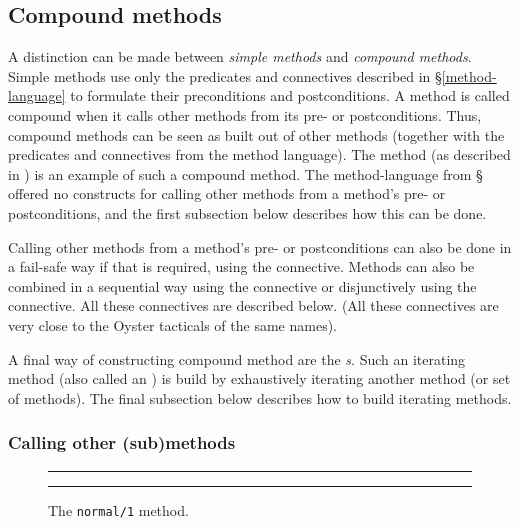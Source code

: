 \subsection {Compound methods}

A distinction can be made between {\em simple
methods\/} and {\em compound
methods\/}. Simple methods use only
the predicates and connectives described in
\S\ref{method-language} to formulate their preconditions and
postconditions. A method is called compound when it calls other
methods from its pre- or postconditions.  Thus, compound methods can
be seen as built out of other methods (together with the predicates
and connectives from the method language).  The {\tt {}}
method (as described in \cite{pub349}) is an example of such a
compound method. The method-language from
\S{} offered no constructs for calling other
methods from a method's pre- or postconditions, and the first
subsection below describes how this can be done.

Calling other methods from a method's pre- or postconditions can also be
done in a fail-safe way if that is required, using the 
connective. 
Methods can also be combined in a sequential way using the 
connective or disjunctively using the  connective. All
these connectives are described below. (All these connectives are very
close to the Oyster tacticals of the same names). 

A final way of constructing compound method are the
{\em {}s}. Such an iterating method (also called
an {\em {}\/}) is build by exhaustively iterating another
method (or set of methods). The final subsection below describes how
to build iterating methods.

\subsubsection {Calling other (sub)methods}
\label{calling-submethods}

\begin{figure}[tb]
\hrule\vspace{1ex}{\small\begin{verbatim}
method(normal(imply_elim(HName,Lemma)),
          H==>G,
          [hyp(HName:A=>B,H),
           (hyp(Lemma:A,H)
            v applicable(H==>A,apply_lemma(Lemma))
            v applicable(H==>A,backchain_lemma(Lemma)))],
          [hfree([NewH],H),
           del_element(HName:A=>B,H,HThin)],
          [[NewH:B|HThin]==>G],
          normal(imply_elim(Lemma))).
\end{verbatim}
}
\caption{The {\tt normal/1} method.}
\label{lemma-fig}
\vspace{1ex}
\hrule
\end{figure}

